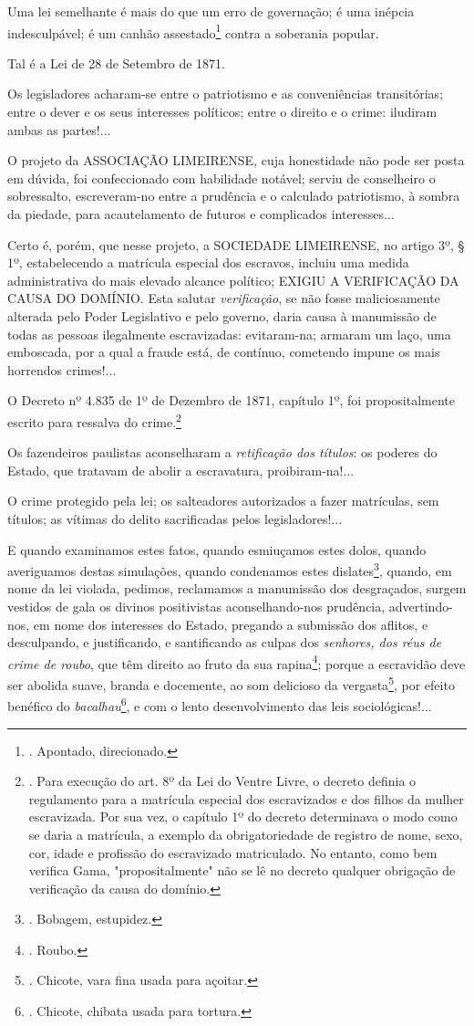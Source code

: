 Uma lei semelhante é mais do que um erro de governação; é uma inépcia
indesculpável; é um canhão assestado\footnote{. Apontado, direcionado.}
contra a soberania popular.

Tal é a Lei de 28 de Setembro de 1871.

Os legisladores acharam-se entre o patriotismo e as conveniências
transitórias; entre o dever e os seus interesses políticos; entre o
direito e o crime: iludiram ambas as partes!...

O projeto da ASSOCIAÇÃO LIMEIRENSE, cuja honestidade não pode ser posta
em dúvida, foi confeccionado com habilidade notável; serviu de
conselheiro o sobressalto, escreveram-no entre a prudência e o calculado
patriotismo, à sombra da piedade, para acautelamento de futuros e
complicados interesses...

Certo é, porém, que nesse projeto, a SOCIEDADE LIMEIRENSE, no artigo 3º,
§ 1º, estabelecendo a matrícula especial dos escravos, incluiu uma
medida administrativa do mais elevado alcance político; EXIGIU A
VERIFICAÇÃO DA CAUSA DO DOMÍNIO. Esta salutar \emph{verificação}, se não
fosse maliciosamente alterada pelo Poder Legislativo e pelo governo,
daria causa à manumissão de todas as pessoas ilegalmente escravizadas:
evitaram-na; armaram um laço, uma emboscada, por a qual a fraude está,
de contínuo, cometendo impune os mais horrendos crimes!...

O Decreto nº 4.835 de 1º de Dezembro de 1871, capítulo 1º, foi
propositalmente escrito para ressalva do crime.\footnote{. Para execução
  do art. 8º da Lei do Ventre Livre, o decreto definia o regulamento
  para a matrícula especial dos escravizados e dos filhos da mulher
  escravizada. Por sua vez, o capítulo 1º do decreto determinava o modo
  como se daria a matrícula, a exemplo da obrigatoriedade de registro de
  nome, sexo, cor, idade e profissão do escravizado matriculado. No
  entanto, como bem verifica Gama, "propositalmente" não se lê no
  decreto qualquer obrigação de verificação da causa do domínio.}

Os fazendeiros paulistas aconselharam a \emph{retificação dos títulos}:
os poderes do Estado, que tratavam de abolir a escravatura,
proibiram-na!...

O crime protegido pela lei; os salteadores autorizados a fazer
matrículas, sem títulos; as vítimas do delito sacrificadas pelos
legisladores!...

E quando examinamos estes fatos, quando esmiuçamos estes dolos, quando
averiguamos destas simulações, quando condenamos estes
dislates\footnote{. Bobagem, estupidez.}, quando, em nome da lei
violada, pedimos, reclamamos a manumissão dos desgraçados, surgem
vestidos de gala os divinos positivistas aconselhando-nos prudência,
advertindo-nos, em nome dos interesses do Estado, pregando a submissão
dos aflitos, e desculpando, e justificando, e santificando as culpas dos
\emph{senhores, dos réus de crime de roubo}, que têm direito ao fruto da
sua rapina\footnote{. Roubo.}; porque a escravidão deve ser abolida
suave, branda e docemente, ao som delicioso da vergasta\footnote{.
  Chicote, vara fina usada para açoitar.}, por efeito benéfico do
\emph{bacalhau}\footnote{. Chicote, chibata usada para tortura.}, e com
o lento desenvolvimento das leis sociológicas!...

